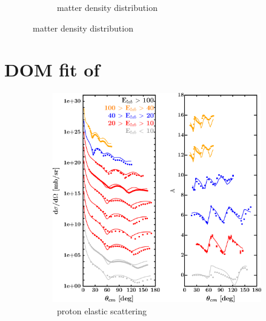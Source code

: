\begin{figure}[hbtp]
\begin{subfigure}{0.70\textwidth}
        \caption{\niEight\ matter density distribution}
        \label{DOMFitData_ni58_matterDensity}
    \end{subfigure}
\end{figure}

\newpage
\section{DOM fit of \niFour}
\label{ni64DOMOutput}
\begin{figure}[hbtp]
    \captionsetup[subfigure]{labelformat=empty}
    \centering
    \begin{subfigure}[c]{0.39\textheight}
        \centering
        \includegraphics[width=\linewidth]{figures/ni64_protonElastic.png}
        \caption{\niFour\ proton elastic scattering}
        \label{DOMFitData_ni64_proton_elastic}
    \end{subfigure}\hspace{6pt}
    \begin{subfigure}[c]{0.39\textheight}
        \centering

\end{subfigure}
\end{figure}
